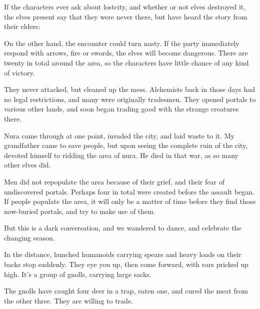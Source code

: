 \begin{multicols}{2}
If the characters ever ask about \gls{lostcity}, and whether or not elves destroyed it, the elves present say that they were never there, but have heard the story from their elders:

On the other hand, the encounter could turn nasty.
If the party immediately respond with arrows, fire or swords, the elves will become dangerous.
There are twenty in total around the area, so the characters have little chance of any kind of victory.

\begin{speechtext}

	They never attacked, but cleaned up the mess.  Alchemists back in those days had no legal restrictions, and many were originally tradesmen.  They opened portals to various other lands, and soon began trading good with the strange creatures there.

	Nura came through at one point, invaded the city, and laid waste to it.  My grandfather came to save people, but upon seeing the complete ruin of the city, devoted himself to ridding the area of nura.  He died in that war, as so many other elves did.

	Men did not repopulate the area because of their grief, and their fear of undiscovered portals.
	Perhaps four in total were created before the assault began.
	If people populate the area, it will only be a matter of time before they find those now-buried portals, and try to make use of them.

	But this is a dark conversation, and we wandered to dance, and celebrate the changing season.

\end{speechtext}


\begin{boxtext}

	In the distance, hunched humanoids carrying spears and heavy loads on their backs stop suddenly.
	They eye you up, then come forward, with ears pricked up high.
	It's a group of gnolls, carrying large sacks.

\end{boxtext}

The gnolls have caught four deer in a trap, eaten one, and cured the meat from the other three.  They are willing to trade.


\gnollhunter



\end{multicols}
